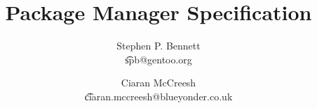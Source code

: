 \documentclass[a4paper]{report}
\title{Package Manager Specification}
\author{Stephen P. Bennett\\\t{spb@gentoo.org}
\and Ciaran McCreesh\\\t{ciaran.mccreesh@blueyonder.co.uk}}
\begin{document}
\maketitle

\tableofcontents
\listofalgorithms
\lstlistoflistings
\listoftables
\listoffixmes
































\end{document}
